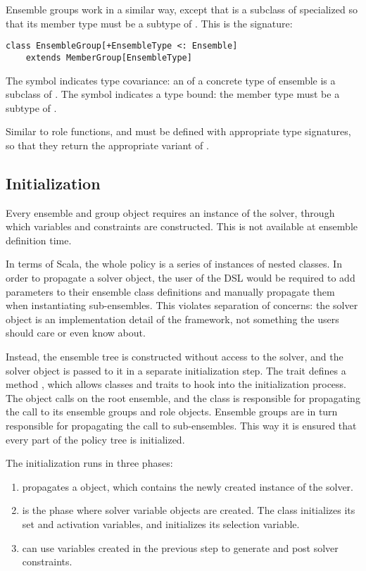 Ensemble groups work in a similar way, except that  is a subclass of
 specialized so that its member type must be a subtype of .
This is the signature:
\begin{lstlisting}[style=snippet]
class EnsembleGroup[+EnsembleType <: Ensemble]
    extends MemberGroup[EnsembleType]
\end{lstlisting}

The \dop{+} symbol indicates type covariance: an  of a concrete
type of ensemble is a subclass of . The \dop{<:} symbol
indicates a type bound: the member type must be a subtype of .

Similar to role functions,  and  must be defined with
appropriate type signatures, so that they return the appropriate variant of
.


\subsection{Initialization}
\label{impl:scala:initialization}

Every ensemble and group object requires an instance of the solver, through which
variables and constraints are constructed. This is not available at ensemble definition
time.

In terms of Scala, the whole policy is a series of instances of nested classes. In order
to propagate a solver object, the user of the DSL would be required to add parameters to
their ensemble class definitions and manually propagate them when instantiating
sub-ensembles. This violates separation of concerns: the solver object is an
implementation detail of the framework, not something the users should care or even know
about.

Instead, the ensemble tree is constructed without access to the solver, and the solver
object is passed to it in a separate initialization step. The  trait
defines a method , which allows classes and traits to hook into the
initialization process. The  object calls  on the root ensemble,
and the  class is responsible for propagating the call to its ensemble
groups and role objects. Ensemble groups are in turn responsible for propagating the
call to sub-ensembles. This way it is ensured that every part of the policy tree is
initialized.

The initialization runs in three phases:
\begin{enumerate}
  \item {} propagates a  object, which contains the newly
  created instance of the solver.
  \item {} is the phase where solver variable objects are created. The
  class  initializes its set and activation variables, and 
  initializes its selection variable.
  \item {} can use variables created in the previous step to generate
  and post solver constraints.
\end{enumerate}

